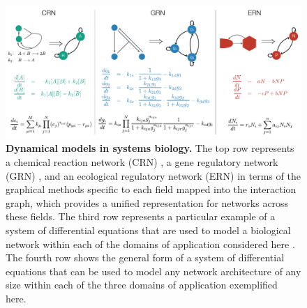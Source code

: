 
\begin{figure}[!ht]
\centering
\noindent\includegraphics[width=0.9\columnwidth]{fig/biomodelexamples.pdf}
\caption{{\bf Dynamical models in systems biology.} The top row represents a chemical reaction network (CRN) \cite{Shinar2010}, a gene regulatory network (GRN) \cite{Karlebach2008}, and an ecological regulatory network (ERN) \cite{Rohr2014} in terms of the graphical methods specific to each field mapped into the interaction graph, which provides a unified representation for networks across these fields. The third row represents a particular example of a system of differential equations that are used to model a biological network within each of the domains of application considered here \cite{Shinar2010,Karlebach2008,Shinar2010}. The fourth row shows the general form of a system of differential equations that can be used to model any network architecture of any size within each of the three domains of application exemplified here.}
\label{fig:biomodelexamples}
\end{figure}

\pagebreak

